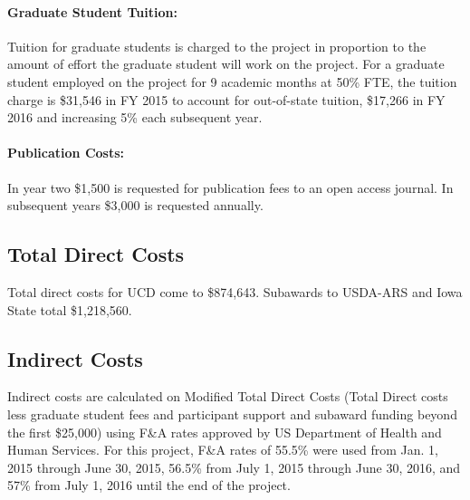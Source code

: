 \paragraph{Graduate Student Tuition:}
Tuition for graduate students is charged to the project in proportion to the amount of effort the graduate student will work on the project. For a graduate student employed on the project for 9 academic months at 50\% FTE, the tuition charge is \$31,546 in FY 2015 to account for out-of-state tuition, \$17,266 in FY 2016 and increasing 5\% each subsequent year.

\paragraph{Publication Costs:}
In year two \$1,500 is requested for publication fees to an open access journal.  In subsequent years \$3,000 is requested annually.

\subsection*{Total Direct Costs}

Total direct costs for UCD come to \$874,643.  Subawards to USDA-ARS and Iowa State total \$1,218,560.

\subsection*{Indirect Costs}
Indirect costs are calculated on Modified Total Direct Costs (Total Direct costs less graduate student fees and participant support and subaward funding beyond the first \$25,000) using F\&A rates approved by US Department of Health and Human Services. For this project, F\&A rates of 55.5\% were used from Jan. 1, 2015 through June 30, 2015, 56.5\% from July 1, 2015 through June 30, 2016, and 57\% from July 1, 2016 until the end of the project.



